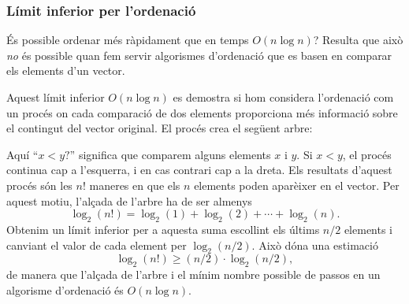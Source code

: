 \subsubsection{Límit inferior per l'ordenació}

És possible ordenar més ràpidament que en temps $O(n \log n)$?
Resulta que això \emph{no} és possible
quan fem servir algorismes d'ordenació
que es basen en comparar els elements d'un vector.

Aquest límit inferior $O(n \log n)$ es demostra si hom
considera l'ordenació com un procés on cada comparació
de dos elements proporciona més informació sobre el
contingut del vector original. El procés crea el següent arbre:

\begin{center}
\end{center}

Aquí ``$x<y?$'' significa que comparem alguns elements
$x$ i $y$. Si $x<y$, el procés continua cap a l'esquerra,
i en cas contrari cap a la dreta.
Els resultats d'aquest procés són les $n!$ maneres
en que els $n$ elements poden aparèixer en el vector.
Per aquest motiu, l'alçada de l'arbre
ha de ser almenys
\[ \log_2(n!) = \log_2(1)+\log_2(2)+\cdots+\log_2(n).\]
Obtenim un límit inferior per a aquesta suma
escollint els últims $n/2$ elements i
canviant el valor de cada element per $\log_2(n/2)$.
Això dóna una estimació
\[ \log_2(n!) \ge (n/2) \cdot \log_2(n/2),\]
de manera que l'alçada de l'arbre i el mínim
nombre possible de passos en un algorisme
d'ordenació és $O(n\log n)$.


